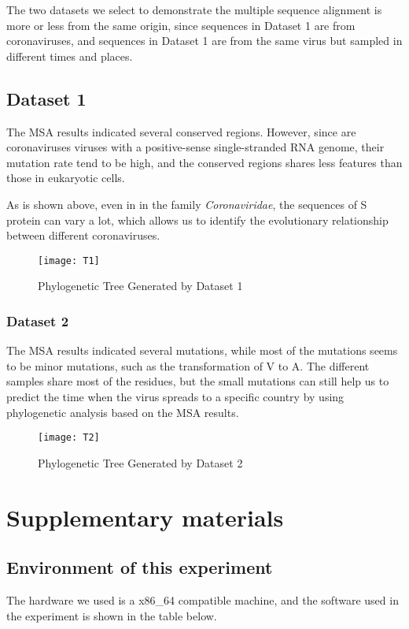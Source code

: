 \documentclass[en,black,12pt,normal]{elegantnote}
\newcommand{\upcite}[1]{\textsuperscript{\textsuperscript{\cite{#1}}}}
\begin{document}
The two datasets we select to demonstrate the multiple sequence alignment is more or less from the same origin, since sequences in Dataset 1 are from coronaviruses, and sequences in Dataset 1 are from the same virus but sampled in different times and places.

\subsection{Dataset 1}

The MSA results indicated several conserved regions. However, since are coronaviruses viruses with a positive-sense single-stranded RNA genome\upcite{cherry2013feigin}, their mutation rate tend to be high, and the conserved regions shares less features than those in eukaryotic cells.

As is shown above, even in in the family \textit{Coronaviridae}, the sequences of S protein can vary a lot, which allows us to identify the evolutionary relationship between different coronaviruses.

\begin{figure}[H]
    \centering
    \texttt{[image: T1]}
    \caption{Phylogenetic Tree Generated by Dataset 1}
    \label{T-01}
\end{figure}


\subsubsection{Dataset 2}

The MSA results indicated several mutations, while most of the mutations seems to be minor mutations, such as the transformation of V to A. The different samples share most of the residues, but the small mutations can still help us to predict the time when the virus spreads to a specific country by using phylogenetic analysis based on the MSA results.

\begin{figure}[H]
    \centering
    \texttt{[image: T2]}
    \caption{Phylogenetic Tree Generated by Dataset 2}
    \label{T-02}
\end{figure}



\section{Supplementary materials}



\subsection{Environment of this experiment}
The hardware we used is a x86\_64 compatible machine,
and the software used in the experiment is shown in the table below.
\end{document}

